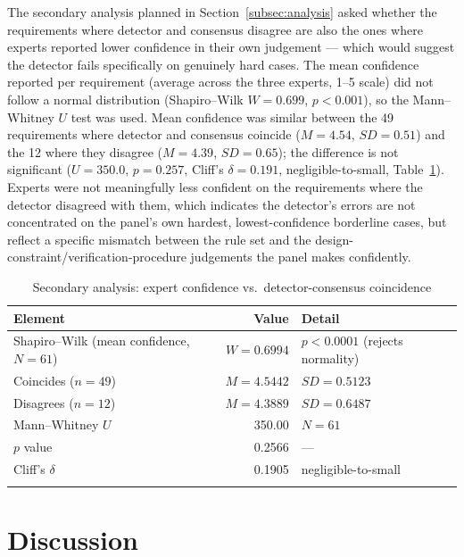 \documentclass[pdflatex,sn-mathphys-num]{sn-jnl}
\theoremstyle{thmstyleone}%
\theoremstyle{thmstyletwo}%
\theoremstyle{thmstylethree}%
\begin{document}
	The secondary analysis planned in Section~\ref{subsec:analysis} asked whether
	the requirements where detector and consensus disagree are also the ones where
	experts reported lower confidence in their own judgement --- which would suggest
	the detector fails specifically on genuinely hard cases. The mean confidence
	reported per requirement (average across the three experts, 1--5 scale) did not
	follow a normal distribution (Shapiro--Wilk $W=0.699$, $p<0.001$), so the
	Mann--Whitney $U$ test was used. Mean confidence was similar between the 49
	requirements where detector and consensus coincide ($M=4.54$, $SD=0.51$) and
	the 12 where they disagree ($M=4.39$, $SD=0.65$); the difference is not
	significant ($U=350.0$, $p=0.257$, Cliff's $\delta=0.191$, negligible-to-small,
	Table~\ref{tab:confianza}). Experts were not meaningfully less confident on the
	requirements where the detector disagreed with them, which indicates the
	detector's errors are not concentrated on the panel's own hardest,
	lowest-confidence borderline cases, but reflect a specific mismatch between the
	rule set and the design-constraint/verification-procedure judgements the panel
	makes confidently.
	
	\begin{table}[h]
		\caption{Secondary analysis: expert confidence vs.\ detector-consensus coincidence}\label{tab:confianza}
		\begin{tabular}{@{}lrl@{}}
			\toprule
			Element & Value & Detail \\
			\midrule
			Shapiro--Wilk (mean confidence, $N=61$) & $W=0.6994$ & $p<0.0001$ (rejects normality) \\
			Coincides ($n=49$) & $M=4.5442$ & $SD=0.5123$ \\
			Disagrees ($n=12$) & $M=4.3889$ & $SD=0.6487$ \\
			Mann--Whitney $U$ & 350.00 & $N=61$ \\
			$p$ value & 0.2566 & --- \\
			Cliff's $\delta$ & 0.1905 & negligible-to-small \\
			\botrule
		\end{tabular}
	\end{table}
	
	\section{Discussion}\label{sec:discussion}
	
\end{document}
